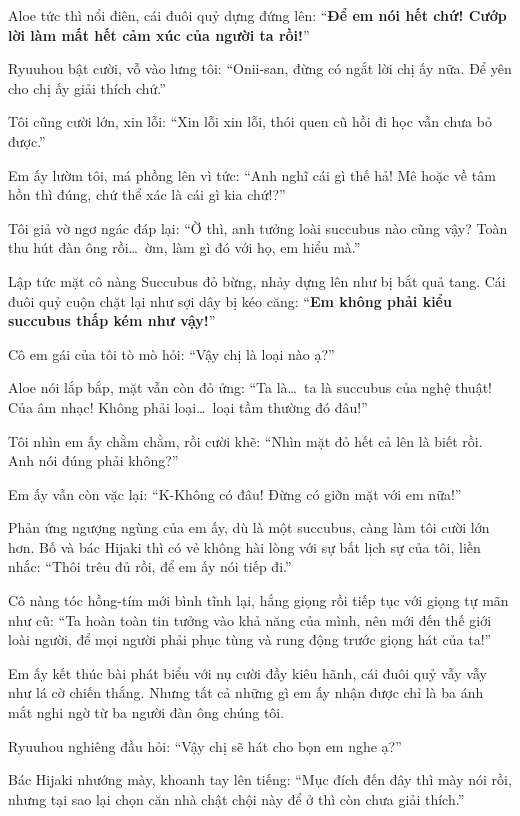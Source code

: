 \documentclass[../main.tex]{subfiles}
\begin{document}
Aloe tức thì nổi điên, cái đuôi quỷ dựng đứng lên: ``\textbf{Để em nói hết chứ! Cướp lời làm mất hết cảm xúc của người ta rồi!}''

Ryuuhou bật cười, vỗ vào lưng tôi: ``Onii-san, đừng có ngắt lời chị ấy nữa. Để yên cho chị ấy giải thích chứ.''

Tôi cũng cười lớn, xin lỗi: ``Xin lỗi xin lỗi, thói quen cũ hồi đi học vẫn chưa bỏ được.''

Em ấy lườm tôi, má phồng lên vì tức: ``Anh nghĩ cái gì thế hả! Mê hoặc về tâm hồn thì đúng, chứ thể xác là cái gì kia chứ!?''

Tôi giả vờ ngơ ngác đáp lại: ``Ờ thì, anh tưởng loài succubus nào cũng vậy? Toàn thu hút đàn ông rồi\dots\ ờm, làm gì đó với họ, em hiểu mà.''

Lập tức mặt cô nàng Succubus đỏ bừng, nhảy dựng lên như bị bắt quả tang. Cái đuôi quỷ cuộn chặt lại như sợi dây bị kéo căng: ``\textbf{Em không phải kiểu succubus thấp kém như vậy!}''

Cô em gái của tôi tò mò hỏi: ``Vậy chị là loại nào ạ?''

Aloe nói lắp bắp, mặt vẫn còn đỏ ửng: ``Ta là\dots\ ta là succubus của nghệ thuật! Của âm nhạc! Không phải loại\dots\ loại tầm thường đó đâu!''

Tôi nhìn em ấy chằm chằm, rồi cười khẽ: ``Nhìn mặt đỏ hết cả lên là biết rồi. Anh nói đúng phải không?''

Em ấy vẫn còn vặc lại: ``K-Không có đâu! Đừng có giỡn mặt với em nữa!''

Phản ứng ngượng ngùng của em ấy, dù là một succubus, càng làm tôi cười lớn hơn. Bố và bác Hijaki thì có vẻ không hài lòng với sự bất lịch sự của tôi, liền nhắc: ``Thôi trêu đủ rồi, để em ấy nói tiếp đi.''

Cô nàng tóc hồng-tím mới bình tĩnh lại, hắng giọng rồi tiếp tục với giọng tự mãn như cũ: ``Ta hoàn toàn tin tưởng vào khả năng của mình, nên mới đến thế giới loài người, để mọi người phải phục tùng và rung động trước giọng hát của ta!''

Em ấy kết thúc bài phát biểu với nụ cười đầy kiêu hãnh, cái đuôi quỷ vẫy vẫy như lá cờ chiến thắng. Nhưng tất cả những gì em ấy nhận được chỉ là ba ánh mắt nghi ngờ từ ba người đàn ông chúng tôi.

Ryuuhou nghiêng đầu hỏi: ``Vậy chị sẽ hát cho bọn em nghe ạ?''

Bác Hijaki nhướng mày, khoanh tay lên tiếng: ``Mục đích đến đây thì mày nói rồi, nhưng tại sao lại chọn căn nhà chật chội này để ở thì còn chưa giải thích.''
\end{document}
